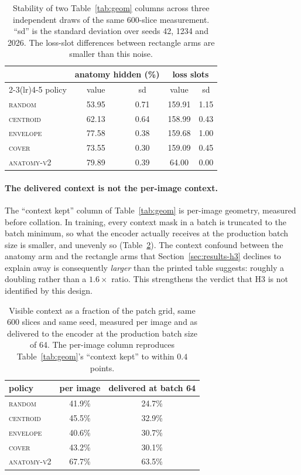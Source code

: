 \documentclass{article}
\newcommand{\ArmBest}{\textsc{centroid}}
\begin{document}
\begin{table}[h]
\centering
\caption{Stability of two Table~\ref{tab:geom} columns across three independent
draws of the same 600-slice measurement. ``sd'' is the standard deviation over
seeds 42, 1234 and 2026. The loss-slot differences between rectangle arms are
smaller than this noise.}
\label{tab:geomprov}
\small
\begin{tabular}{lcccc}
\toprule
 & \multicolumn{2}{c}{anatomy hidden (\%)} & \multicolumn{2}{c}{loss slots} \\
\cmidrule(lr){2-3}\cmidrule(lr){4-5}
policy & value & sd & value & sd \\
\midrule
\textsc{random}     & 53.95 & 0.71 & 159.91 & 1.15 \\
\ArmBest{}          & 62.13 & 0.64 & 158.99 & 0.43 \\
\textsc{envelope}   & 77.58 & 0.38 & 159.68 & 1.00 \\
\textsc{cover}      & 73.55 & 0.30 & 159.09 & 0.45 \\
\textsc{anatomy-v2} & 79.89 & 0.39 & 64.00  & 0.00 \\
\bottomrule
\end{tabular}
\end{table}

\paragraph{The delivered context is not the per-image context.} The ``context
kept'' column of Table~\ref{tab:geom} is per-image geometry, measured before
collation. In training, every context mask in a batch is truncated to the batch
minimum, so what the encoder actually receives at the production batch size is
smaller, and unevenly so (Table~\ref{tab:delivered}). The context confound
between the anatomy arm and the rectangle arms that
Section~\ref{sec:results-h3} declines to explain
away is consequently \emph{larger} than the printed table suggests: roughly a
doubling rather than a $1.6\times$ ratio. This strengthens the verdict that H3
is not identified by this design.

\begin{table}[h]
\centering
\caption{Visible context as a fraction of the patch grid, same 600 slices and
same seed, measured per image and as delivered to the encoder at the production
batch size of 64. The per-image column reproduces
Table~\ref{tab:geom}'s ``context kept'' to within $0.4$ points.}
\label{tab:delivered}
\small
\begin{tabular}{lcc}
\toprule
policy & per image & delivered at batch 64 \\
\midrule
\textsc{random}     & 41.9\% & 24.7\% \\
\ArmBest{}          & 45.5\% & 32.9\% \\
\textsc{envelope}   & 40.6\% & 30.7\% \\
\textsc{cover}      & 43.2\% & 30.1\% \\
\textsc{anatomy-v2} & 67.7\% & 63.5\% \\
\bottomrule
\end{tabular}
\end{table}
\end{document}
